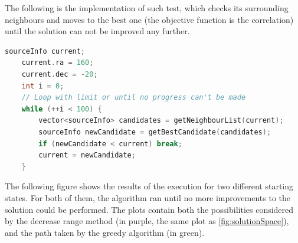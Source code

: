 The following is the implementation of such test, which checks its surrounding neighbours and moves to the best one (the objective function is the correlation) until the solution can not be improved any further.

\begin{minipage}{\linewidth}
	\begin{lstlisting}[language=c, caption=Hill Climbing]
	sourceInfo current;
	current.ra = 160;
	current.dec = -20;
	int i = 0;
	// Loop with limit or until no progress can't be made
	while (++i < 100) {
		vector<sourceInfo> candidates = getNeighbourList(current);
		sourceInfo newCandidate = getBestCandidate(candidates);
		if (newCandidate < current) break;
		current = newCandidate;
	}\end{lstlisting}
\end{minipage}

The following figure shows the results of the execution for two different starting states. For both of them, the algorithm ran until no more improvements to the solution could be performed. The plots contain both the possibilities considered by the decrease range method (in purple, the same plot as \ref{fig:solutionSpace}), and the path taken by the greedy algorithm (in green).

